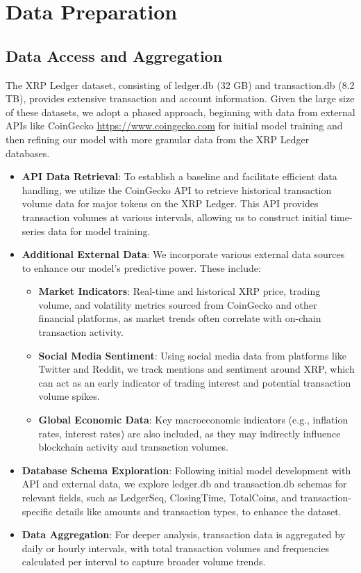 \documentclass{article}
\begin{document}
\section{Data Preparation}

\subsection{Data Access and Aggregation}
The XRP Ledger dataset, consisting of ledger.db (32 GB) and transaction.db (8.2 TB), provides extensive transaction and account information. Given the large size of these datasets, we adopt a phased approach, beginning with data from external APIs like CoinGecko \url{https://www.coingecko.com} for initial model training and then refining our model with more granular data from the XRP Ledger databases.

\begin{itemize}
    \item \textbf{API Data Retrieval}: To establish a baseline and facilitate efficient data handling, we utilize the CoinGecko API to retrieve historical transaction volume data for major tokens on the XRP Ledger. This API provides transaction volumes at various intervals, allowing us to construct initial time-series data for model training.
    \item \textbf{Additional External Data}: We incorporate various external data sources to enhance our model's predictive power. These include:
        \begin{itemize}
            \item \textbf{Market Indicators}: Real-time and historical XRP price, trading volume, and volatility metrics sourced from CoinGecko and other financial platforms, as market trends often correlate with on-chain transaction activity.
            \item \textbf{Social Media Sentiment}: Using social media data from platforms like Twitter and Reddit, we track mentions and sentiment around XRP, which can act as an early indicator of trading interest and potential transaction volume spikes.
            \item \textbf{Global Economic Data}: Key macroeconomic indicators (e.g., inflation rates, interest rates) are also included, as they may indirectly influence blockchain activity and transaction volumes.
        \end{itemize}
    \item \textbf{Database Schema Exploration}: Following initial model development with API and external data, we explore ledger.db and transaction.db schemas for relevant fields, such as LedgerSeq, ClosingTime, TotalCoins, and transaction-specific details like amounts and transaction types, to enhance the dataset.
    \item \textbf{Data Aggregation}: For deeper analysis, transaction data is aggregated by daily or hourly intervals, with total transaction volumes and frequencies calculated per interval to capture broader volume trends.
\end{itemize}
\end{document}
